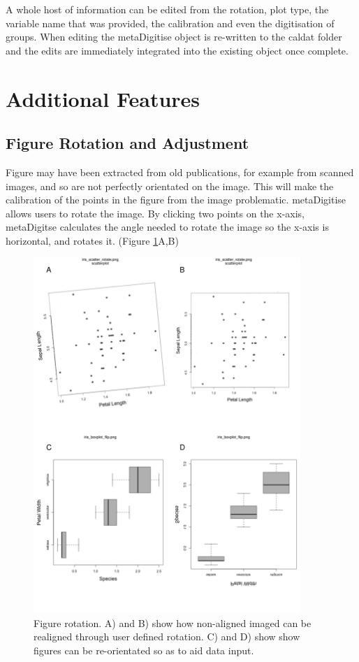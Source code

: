 \documentclass{article}
\begin{document}
A whole host of information can be edited from the rotation, plot type, the variable name that was provided, the calibration and even the digitisation of groups. When editing the metaDigitise object is re-written to the caldat folder and the edits are immediately integrated into the existing object once complete. 

\section{Additional Features}

\subsection{Figure Rotation and Adjustment}
Figure may have been extracted from old publications, for example from scanned images, and so are not perfectly orientated on the image. This will make the calibration of the points in the figure from the image problematic. metaDigitise allows users to rotate the image. By clicking two points on the x-axis, metaDigitse calculates the angle needed to rotate the image so the x-axis is horizontal, and rotates it. (Figure \ref{fig:rotate}A,B)

\begin{figure}[!h] 
 \includegraphics[width=0.9\textwidth]{fig_rotate.pdf} 
 \caption{Figure rotation. A) and B) show how non-aligned imaged can be realigned through user defined rotation. C) and D) show show figures can be re-orientated so as to aid data input.}
\label{fig:rotate}
\end{figure}
\end{document}

